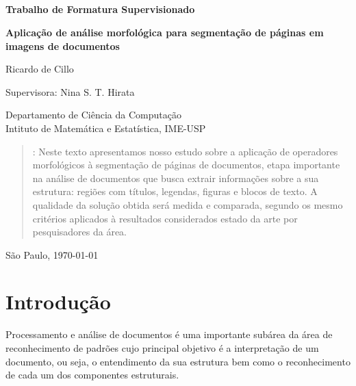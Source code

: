 \documentclass[a4paper,11pt]{article}
\begin{document}


\thispagestyle{empty}
\

\

\

\

\begin{center}
{\bf \Large Trabalho de Formatura Supervisionado}

\bigskip
\bigskip
{\bf \LARGE Aplicação de análise morfológica para segmentação de páginas em imagens de documentos}

\bigskip
{\large Ricardo de Cillo}

\bigskip
Supervisora: Nina S. T. Hirata 

\bigskip
Departamento de Ciência da Computação\\
Intituto de Matemática e Estatística, IME-USP
\end{center}


\bigskip
\begin{quote}
\begin{spacing}{1.2}
: Neste texto apresentamos nosso estudo sobre a aplicação de operadores morfológicos à segmentação de páginas de documentos, etapa importante na análise de documentos que busca extrair informações sobre a sua estrutura: regiões com títulos, legendas, figuras e blocos de texto. A qualidade da solução obtida será medida e comparada, segundo os mesmo critérios aplicados à resultados considerados estado da arte por pesquisadores da área.
\end{spacing} 
\end{quote}

\bigskip
\begin{center}
São Paulo, \today
\end{center}



\newpage
\setcounter{page}{1}



\section{Introdução}

Processamento e análise de documentos é uma importante subárea da área
de reconhecimento de padrões cujo principal objetivo é a
interpretação de um documento, ou seja, o entendimento
da sua estrutura bem como o reconhecimento de cada um dos
componentes estruturais.
\end{document}
